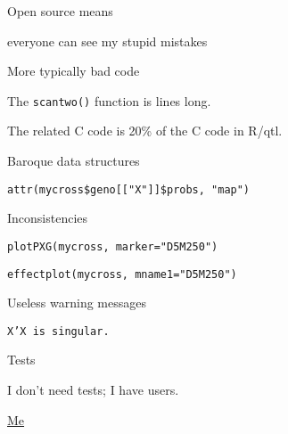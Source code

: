 \documentclass[12pt,t,aspectratio=169]{beamer}
\begin{document}
\begin{frame}[c]{}

  \large

  {\hilit Open source} {\lolit means}

  everyone can see my stupid mistakes

  \bigskip \bigskip \bigskip


\end{frame}


\begin{frame}[c]{More typically bad code}

  \large
      The {\hilit \tt scantwo()} function is { lines} long.

      \bigskip \bigskip

      The related C code is 20\% of the C code in R/qtl.


\end{frame}

\begin{frame}[c]{Baroque data structures}

  \large
      {\tt attr(mycross\$geno[["X"]]\$probs, "map")}

\end{frame}



\begin{frame}[c]{Inconsistencies}

  \large
      {\tt plotPXG(mycross, marker="D5M250")}

      \bigskip

      {\tt effectplot(mycross, mname1="D5M250")}


\end{frame}


\begin{frame}[c]{Useless warning messages}

  \large
      {\tt X'X is singular.}

\end{frame}




\begin{frame}[c]{Tests}
\end{frame}


\begin{frame}[c]{}

\begin{center}
\large

I don't need tests; I have users.
\end{center}

\bigskip

\bigskip

\hfill
{\lolit
{\textendash} \href{https://kbroman.org}{Me} \hspace*{24mm}
}

\end{frame}
\end{document}
